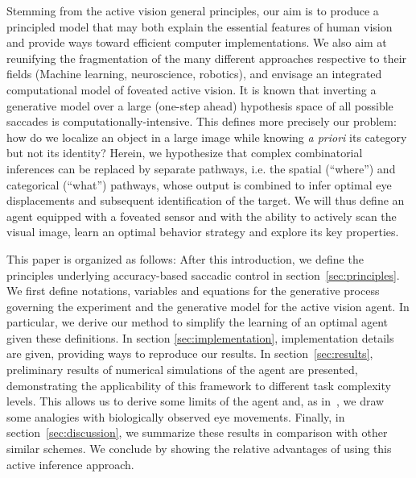 Stemming from the active vision general principles, our aim is to produce a principled model that may both explain the essential features of human vision and provide ways toward efficient computer implementations. We also aim at reunifying the fragmentation of the many different approaches respective to their fields (Machine learning, neuroscience, robotics), and envisage an integrated computational model of foveated active vision. It is known that inverting a generative model over a large (one-step ahead) hypothesis space of all possible saccades is computationally-intensive. %
This defines more precisely our problem: how do we localize an object in a large image while knowing \emph{a priori} its category but not its identity? 
Herein, we hypothesize that complex combinatorial inferences can be replaced by separate pathways, i.e. the spatial (``where'') and categorical (``what'') pathways, whose output is combined to infer optimal eye displacements and subsequent identification of the target. 
We will thus define an agent equipped with a foveated sensor and with the ability to actively scan the visual image, %
learn an optimal behavior strategy and explore its key properties.

This paper is organized as follows: After this introduction, we define the principles underlying accuracy-based saccadic control in section~\ref{sec:principles}. We first define notations, variables and equations for the generative process governing the experiment and the generative model for the active vision agent. In particular, we derive our method to simplify the learning of an optimal agent given these definitions. In section \ref{sec:implementation}, implementation details are given, providing ways to reproduce our results. In section~\ref{sec:results}, preliminary results of numerical simulations of the agent are presented, demonstrating the applicability of this framework to different task complexity levels. This allows us to derive some limits of the agent and, as in~\citep{Najemnik05}, we draw some analogies with biologically observed eye movements. Finally, in section~\ref{sec:discussion}, we summarize these results in comparison with other similar schemes. We conclude by showing the relative advantages of using this active inference approach.
